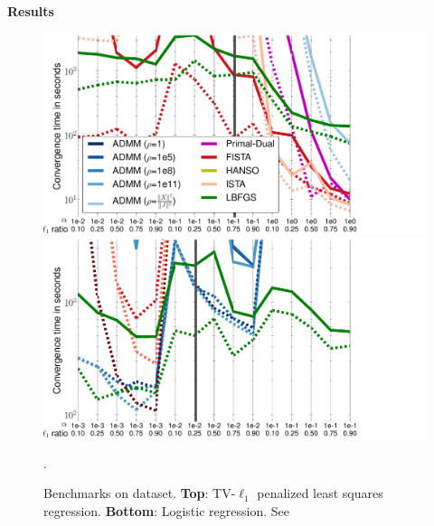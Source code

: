 \documentclass[french]{STIC_poster}
\begin{document}
\begin{frame}[t]
\begin{columns}[t]
\begin{column}{.48\linewidth}
\begin{abox}{\textbf{Results}}
                            \begin{figure}
                              \includegraphics[width=1.2\linewidth]{bench/haxby_mse.pdf}%
                              \hspace{-.09\linewidth}%
                              \includegraphics[width=1.2\linewidth]{bench/haxby_lr.pdf}
                              \caption{Benchmarks on \textcolor{cyan}{\cite{haxby2001}} dataset. \textbf{Top}: TV-$\ell_1$ penalized least squares regression.
                                \textbf{Bottom}: Logistic regression. See \textcolor{cyan}{\cite{dohmatob2014benchmarking}}}.
                              \label{Fig:MSEtimes}
                            \end{figure}

\end{abox}
\end{column}
\end{columns}
\end{frame}
\end{document}
